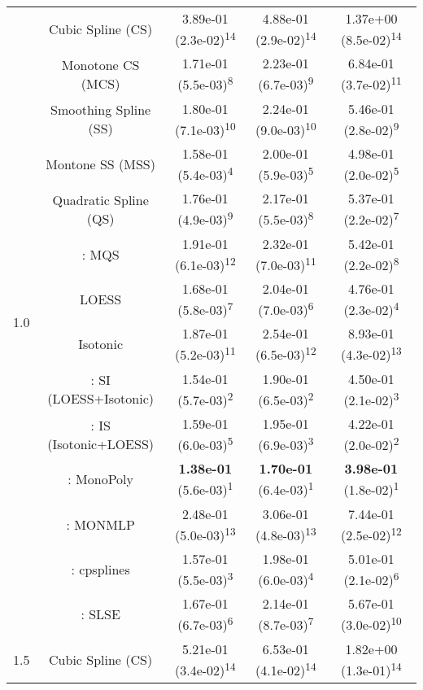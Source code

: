 \begin{tabular}{ccccc}
\midrule
\multirow{14}{*}{1.0}&Cubic Spline (CS)& 3.89e-01 (2.3e-02)\textsuperscript{14}& 4.88e-01 (2.9e-02)\textsuperscript{14}& 1.37e+00 (8.5e-02)\textsuperscript{14}\tabularnewline
&Monotone CS (MCS)& 1.71e-01 (5.5e-03)\textsuperscript{8}& 2.23e-01 (6.7e-03)\textsuperscript{9}& 6.84e-01 (3.7e-02)\textsuperscript{11}\tabularnewline
&Smoothing Spline (SS)& 1.80e-01 (7.1e-03)\textsuperscript{10}& 2.24e-01 (9.0e-03)\textsuperscript{10}& 5.46e-01 (2.8e-02)\textsuperscript{9}\tabularnewline
&Montone SS (MSS)& 1.58e-01 (5.4e-03)\textsuperscript{4}& 2.00e-01 (5.9e-03)\textsuperscript{5}& 4.98e-01 (2.0e-02)\textsuperscript{5}\tabularnewline
&Quadratic Spline (QS)& 1.76e-01 (4.9e-03)\textsuperscript{9}& 2.17e-01 (5.5e-03)\textsuperscript{8}& 5.37e-01 (2.2e-02)\textsuperscript{7}\tabularnewline
&\textcite{heMonotoneBsplineSmoothing1998}: MQS& 1.91e-01 (6.1e-03)\textsuperscript{12}& 2.32e-01 (7.0e-03)\textsuperscript{11}& 5.42e-01 (2.2e-02)\textsuperscript{8}\tabularnewline
&LOESS& 1.68e-01 (5.8e-03)\textsuperscript{7}& 2.04e-01 (7.0e-03)\textsuperscript{6}& 4.76e-01 (2.3e-02)\textsuperscript{4}\tabularnewline
&Isotonic& 1.87e-01 (5.2e-03)\textsuperscript{11}& 2.54e-01 (6.5e-03)\textsuperscript{12}& 8.93e-01 (4.3e-02)\textsuperscript{13}\tabularnewline
&\textcite{mammenEstimatingSmoothMonotone1991}: SI (LOESS+Isotonic)& 1.54e-01 (5.7e-03)\textsuperscript{2}& 1.90e-01 (6.5e-03)\textsuperscript{2}& 4.50e-01 (2.1e-02)\textsuperscript{3}\tabularnewline
&\textcite{mammenEstimatingSmoothMonotone1991}: IS (Isotonic+LOESS)& 1.59e-01 (6.0e-03)\textsuperscript{5}& 1.95e-01 (6.9e-03)\textsuperscript{3}& 4.22e-01 (2.0e-02)\textsuperscript{2}\tabularnewline
&\textcite{murrayFastFlexibleMethods2016a}: MonoPoly& \textbf{1.38e-01} (5.6e-03)\textsuperscript{1}& \textbf{1.70e-01} (6.4e-03)\textsuperscript{1}& \textbf{3.98e-01} (1.8e-02)\textsuperscript{1}\tabularnewline
&\textcite{cannonMonmlpMultilayerPerceptron2017}: MONMLP& 2.48e-01 (5.0e-03)\textsuperscript{13}& 3.06e-01 (4.8e-03)\textsuperscript{13}& 7.44e-01 (2.5e-02)\textsuperscript{12}\tabularnewline
&\textcite{navarro-garciaConstrainedSmoothingOutofrange2023}: cpsplines& 1.57e-01 (5.5e-03)\textsuperscript{3}& 1.98e-01 (6.0e-03)\textsuperscript{4}& 5.01e-01 (2.1e-02)\textsuperscript{6}\tabularnewline
&\textcite{groeneboomConfidenceIntervalsMonotone2023}: SLSE& 1.67e-01 (6.7e-03)\textsuperscript{6}& 2.14e-01 (8.7e-03)\textsuperscript{7}& 5.67e-01 (3.0e-02)\textsuperscript{10}\tabularnewline
\midrule
\multirow{14}{*}{1.5}&Cubic Spline (CS)& 5.21e-01 (3.4e-02)\textsuperscript{14}& 6.53e-01 (4.1e-02)\textsuperscript{14}& 1.82e+00 (1.3e-01)\textsuperscript{14}\tabularnewline

\end{tabular}
